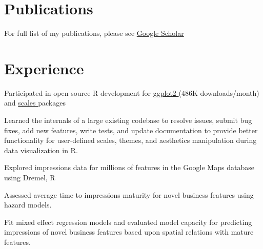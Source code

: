 \documentclass[]{deedy-resume-openfont}
\begin{document}
\begin{minipage}[t]{0.32\textwidth}
\section{Publications}
For full list of my publications, please see \href{https://scholar.google.com/citations?user=0BKLXCUAAAAJ}{Google Scholar \faGraduationCap} 

%
%

\end{minipage} 
\hfill
\begin{minipage}[t]{0.66\textwidth} 


\section{Experience}

\vspace{\topsep} %
\begin{tightemize}
\item Participated in open source R development for \href{https://github.com/tidyverse/ggplot2}{ggplot2 \faGithub{}} (486K downloads/month) and \href{https://github.com/r-lib/scales}{scales \faGithub} packages
\item Learned the internals of a large existing codebase to resolve issues, submit bug fixes, add new features, write tests, and update documentation to provide better functionality for user-defined scales, themes, and aesthetics manipulation during data visualization in R. 
\end{tightemize}
\sectionsep

\begin{tightemize}
\item Explored impressions data for millions of features in the Google Maps database using Dremel, R
\item Assessed average time to impressions maturity for novel business features using hazard models.
\item Fit mixed effect regression models and evaluated model capacity for predicting impressions of novel business features based upon spatial relations with mature features.
\end{tightemize}
\sectionsep


\end{minipage}
\end{document}

